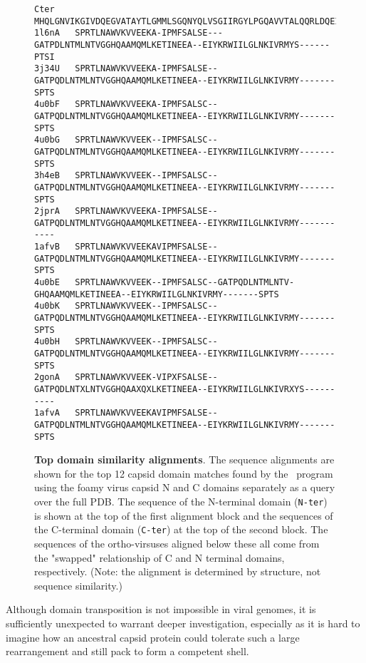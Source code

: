 \begin{figure}
\begin{singlespace}
\begin{tiny}
\begin{Verbatim}[frame=single]
Cter    MHQLGNVIKGIVDQEGVATAYTLGMMLSGQNYQLVSGIIRGYLPGQAVVTALQQRLDQEIDNQTRAETFIQHLNAVYEILGLNARGQSIRL
1l6nA   SPRTLNAWVKVVEEKA-IPMFSALSE---GATPDLNTMLNTVGGHQAAMQMLKETINEEA--EIYKRWIILGLNKIVRMYS------PTSI
3j34U   SPRTLNAWVKVVEEKA-IPMFSALSE--GATPQDLNTMLNTVGGHQAAMQMLKETINEEA--EIYKRWIILGLNKIVRMY-------SPTS
4u0bF   SPRTLNAWVKVVEEKA-IPMFSALSC--GATPQDLNTMLNTVGGHQAAMQMLKETINEEA--EIYKRWIILGLNKIVRMY-------SPTS
4u0bG   SPRTLNAWVKVVEEK--IPMFSALSC--GATPQDLNTMLNTVGGHQAAMQMLKETINEEA--EIYKRWIILGLNKIVRMY-------SPTS
3h4eB   SPRTLNAWVKVVEEK--IPMFSALSC--GATPQDLNTMLNTVGGHQAAMQMLKETINEEA--EIYKRWIILGLNKIVRMY-------SPTS
2jprA   SPRTLNAWVKVVEEKA-IPMFSALSE--GATPQDLNTMLNTVGGHQAAMQMLKETINEEA--EIYKRWIILGLNKIVRMY-----------
1afvB   SPRTLNAWVKVVEEKAVIPMFSALSE--GATPQDLNTMLNTVGGHQAAMQMLKETINEEA--EIYKRWIILGLNKIVRMY-------SPTS
4u0bE   SPRTLNAWVKVVEEK--IPMFSALSC--GATPQDLNTMLNTV-GHQAAMQMLKETINEEA--EIYKRWIILGLNKIVRMY-------SPTS
4u0bK   SPRTLNAWVKVVEEK--IPMFSALSC--GATPQDLNTMLNTVGGHQAAMQMLKETINEEA--EIYKRWIILGLNKIVRMY-------SPTS
4u0bH   SPRTLNAWVKVVEEK--IPMFSALSC--GATPQDLNTMLNTVGGHQAAMQMLKETINEEA--EIYKRWIILGLNKIVRMY-------SPTS
2gonA   SPRTLNAWVKVVEEK-VIPXFSALSE--GATPQDLNTXLNTVGGHQAAXQXLKETINEEA--EIYKRWIILGLNKIVRXYS----------
1afvA   SPRTLNAWVKVVEEKAVIPMFSALSE--GATPQDLNTMLNTVGGHQAAMQMLKETINEEA--EIYKRWIILGLNKIVRMY-------SPTS
\end{Verbatim}
\end{tiny}
\end{singlespace}
\begin{footnotesize}
\caption{
\label{Fig:swap}
{\bf Top domain similarity alignments}.
The sequence alignments are shown for the top 12 capsid domain matches found by the \DALI\ program 
using the foamy virus capsid N and C domains separately as a query over the full PDB.
The sequence of the N-terminal domain ({\tt N-ter}) is shown at the top of the first alignment block and the
sequences of the C-terminal domain ({\tt C-ter}) at the top of the second block.   The sequences of the
ortho-virsuses aligned below these all come from the "swapped" relationship of C and N terminal domains,
respectively.  (Note: the alignment is determined by structure, not sequence similarity.)
}
\end{footnotesize}
\end{figure}

Although domain transposition is not impossible in viral genomes,  it is sufficiently
unexpected to warrant deeper investigation, especially as it is hard to imagine how an ancestral
capsid protein could tolerate such a large rearrangement and still pack to form a competent shell.

